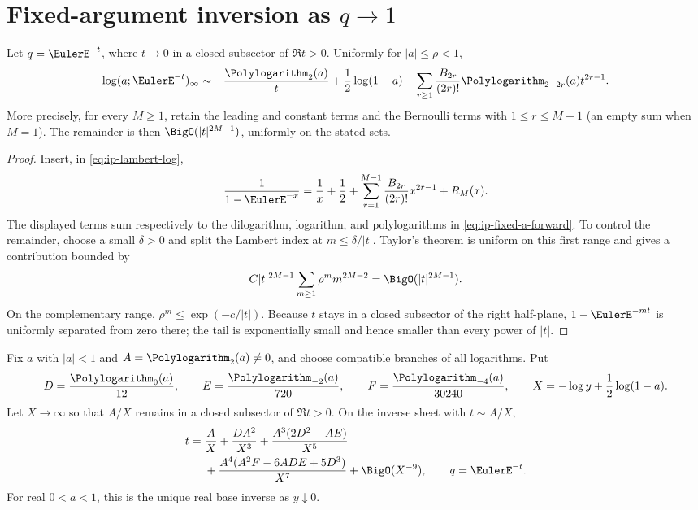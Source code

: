 \section{Fixed-argument inversion as \(q\to1\)}
\label{sec:ip-fixed-a-qone}

\begin{theorem}
\label{thm:ip-fixed-a-expansion}
Let \(q=\EulerE^{-t}\), where \(t\to0\) in a closed subsector of
\(\Re t>0\).  Uniformly for \(|a|\leq\rho<1\),
\begin{equation}
 \log(a;\EulerE^{-t})_\infty
 \sim-\frac{\Polylogarithm_2(a)}t+\frac12\log(1-a)
 -\sum_{r\geq1}\frac{B_{2r}}{(2r)!}
 \Polylogarithm_{2-2r}(a)t^{2r-1}.
 \label{eq:ip-fixed-a-forward}
\end{equation}
More precisely, for every \(M\geq1\), retain the leading and constant terms
and the Bernoulli terms with \(1\leq r\leq M-1\) (an empty sum when \(M=1\)).
The remainder is then \(\BigO(|t|^{2M-1})\), uniformly on the stated sets.
\end{theorem}

\begin{proof}
Insert, in \cref{eq:ip-lambert-log},
\[
 \frac1{1-\EulerE^{-x}}=\frac1x+\frac12+
 \sum_{r=1}^{M-1}\frac{B_{2r}}{(2r)!}x^{2r-1}+R_M(x).
\]
The displayed terms sum respectively to the dilogarithm, logarithm, and
polylogarithms in \cref{eq:ip-fixed-a-forward}.  To control the remainder,
choose a small \(\delta>0\) and split the Lambert index at
\(m\leq\delta/|t|\).  Taylor's theorem is uniform on this first range and
gives a contribution bounded by
\[
 C|t|^{2M-1}\sum_{m\geq1}\rho^m m^{2M-2}
 =\BigO(|t|^{2M-1}).
\]
On the complementary range, \(\rho^m\leq
\exp(-c/|t|)\).  Because \(t\) stays in a closed subsector of the right
half-plane, \(1-\EulerE^{-mt}\) is uniformly separated from zero there; the tail
is exponentially small and hence smaller than every power of \(|t|\).
\end{proof}

\begin{theorem}
\label{thm:ip-fixed-a-inverse}
Fix \(a\) with \(|a|<1\) and \(A=\Polylogarithm_2(a)\ne0\), and choose compatible
branches of all logarithms.  Put
\[
 D=\frac{\Polylogarithm_0(a)}{12},\qquad
 E=\frac{\Polylogarithm_{-2}(a)}{720},\qquad
 F=\frac{\Polylogarithm_{-4}(a)}{30240},\qquad
 X=-\log y+\frac12\log(1-a).
\]
Let \(X\to\infty\) so that \(A/X\) remains in a closed subsector of
\(\Re t>0\).  On the inverse sheet with \(t\sim A/X\),
\begin{align}
 t={}&\frac AX+\frac{DA^2}{X^3}
 +\frac{A^3(2D^2-AE)}{X^5}\notag\\
 &+\frac{A^4(A^2F-6ADE+5D^3)}{X^7}
 +\BigO(X^{-9}),\qquad q=\EulerE^{-t}.
 \label{eq:ip-fixed-a-inverse}
\end{align}
For real \(0<a<1\), this is the unique real base inverse as \(y\downarrow0\).
\end{theorem}

